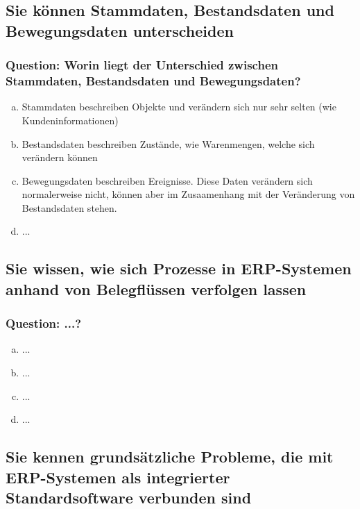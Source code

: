 \documentclass{article}
\begin{document}
\begin{adjustwidth}{2em}{2em}
\begin{adjustwidth}{2em}{2em}
			\subsection{Sie können Stammdaten, Bestandsdaten und Bewegungsdaten unterscheiden}
			\begin{adjustwidth}{1em}{}
				\subsubsection*{Question: Worin liegt der Unterschied zwischen Stammdaten, Bestandsdaten und Bewegungsdaten?}
				\begin{adjustwidth}{1em}{}
					\begin{enumerate}[(a)]
						\item Stammdaten beschreiben Objekte und verändern sich nur sehr selten (wie Kundeninformationen)
						\item Bestandsdaten beschreiben Zustände, wie Warenmengen, welche sich verändern können
						\item Bewegungsdaten beschreiben Ereignisse. Diese Daten verändern sich normalerweise nicht, können aber im Zusaamenhang mit der Veränderung von Bestandsdaten stehen.
						\item ...
					\end{enumerate}
				\end{adjustwidth}
			\end{adjustwidth}
			\subsection{Sie wissen, wie sich Prozesse in ERP-Systemen anhand von Belegflüssen verfolgen lassen}
			\begin{adjustwidth}{1em}{}
				\subsubsection*{Question: ...?}
				\begin{adjustwidth}{1em}{}
					\begin{enumerate}[(a)]
						\item ...
						\item ...
						\item ...
						\item ...
					\end{enumerate}
				\end{adjustwidth}
			\end{adjustwidth}
			\subsection{Sie kennen grundsätzliche Probleme, die mit ERP-Systemen als integrierter Standardsoftware verbunden sind}
			\begin{adjustwidth}{1em}{}

\end{adjustwidth}
\end{adjustwidth}
\end{adjustwidth}
\end{document}

